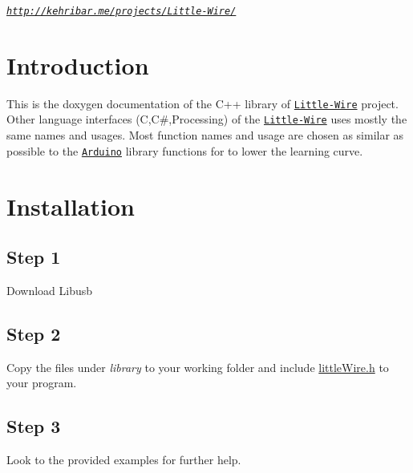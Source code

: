  \begin{center} {\itshape  \href{http://kehribar.me/projects/Little-Wire/}{\tt http\-://kehribar.\-me/projects/\-Little-\/\-Wire/} \/} \end{center}  \hypertarget{index_intro_sec}{}\section{\-Introduction}\label{index_intro_sec}
\-This is the doxygen documentation of the \-C++ library of \href{http://kehribar.me/projects/Little-Wire/}{\tt \-Little-\/\-Wire} project. \-Other language interfaces (\-C,\-C\#,\-Processing) of the \href{http://kehribar.me/projects/Little-Wire/}{\tt \-Little-\/\-Wire} uses mostly the same names and usages. \-Most function names and usage are chosen as similar as possible to the \href{http://arduino.cc}{\tt \-Arduino} library functions for to lower the learning curve.\hypertarget{index_install_sec}{}\section{\-Installation}\label{index_install_sec}
\hypertarget{index_step1}{}\subsection{\-Step 1}\label{index_step1}
\-Download \-Libusb \hypertarget{index_step2}{}\subsection{\-Step 2}\label{index_step2}
\-Copy the files under {\itshape library\/} to your working folder and include \hyperlink{littleWire_8h_source}{little\-Wire.\-h} to your program. \hypertarget{index_step3}{}\subsection{\-Step 3}\label{index_step3}
\-Look to the provided examples for further help. 
